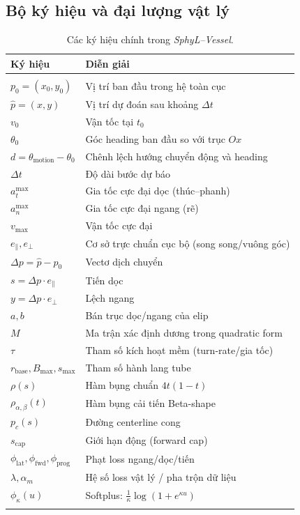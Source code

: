 \documentclass{IEEEtran}
\begin{document}
\subsection{ Bộ ký hiệu và đại lượng vật lý}
\begin{table}[H]
\caption{Các ký hiệu chính trong \emph{SphyL--Vessel}.}
\label{tab:sphyl-symbols}
\centering
\begin{tabular}{ll}
\hline
Ký hiệu & Diễn giải \\
\hline\\[4pt]
$p_0=(x_0,y_0)$ & Vị trí ban đầu trong hệ toàn cục \\
$\hat{p}=(x,y)$ & Vị trí dự đoán sau khoảng $\Delta t$ \\
$v_0$ & Vận tốc tại $t_0$ \\
$\theta_0$ & Góc heading ban đầu so với trục $Ox$ \\
$d=\theta_{\text{motion}}-\theta_0$ & Chênh lệch hướng chuyển động và heading \\
$\Delta t$ & Độ dài bước dự báo \\
$a_t^{\max}$ & Gia tốc cực đại dọc (thúc--phanh) \\
$a_n^{\max}$ & Gia tốc cực đại ngang (rẽ) \\
$v_{\max}$ & Vận tốc cực đại \\
$e_{\parallel},e_{\perp}$ & Cơ sở trực chuẩn cục bộ (song song/vuông góc) \\
$\Delta p=\hat{p}-p_0$ & Vectơ dịch chuyển \\
$s=\Delta p \cdot e_{\parallel}$ & Tiến dọc \\
$y=\Delta p \cdot e_{\perp}$ & Lệch ngang \\
$a,b$ & Bán trục dọc/ngang của elip \\
$M$ & Ma trận xác định dương trong quadratic form \\
$\tau$ & Tham số kích hoạt mềm (turn-rate/gia tốc) \\
$r_{\text{base}}, B_{\max}, s_{\max}$ & Tham số hành lang tube \\
$\rho(s)$ & Hàm bụng chuẩn $4t(1-t)$ \\
$\rho_{\alpha,\beta}(t)$ & Hàm bụng cải tiến Beta-shape \\
$p_c(s)$ & Đường centerline cong \\
$s_{\text{cap}}$ & Giới hạn động (forward cap) \\
$\phi_{\text{lat}},\phi_{\text{fwd}},\phi_{\text{prog}}$ & Phạt loss ngang/dọc/tiến \\
$\lambda, \alpha_m$ & Hệ số loss vật lý / pha trộn dữ liệu \\
$\phi_{\kappa}(u)$ & Softplus: $\tfrac{1}{\kappa}\log(1+e^{\kappa u})$ \\
\\[4pt]
\hline
\end{tabular}
\end{table}
\end{document}
